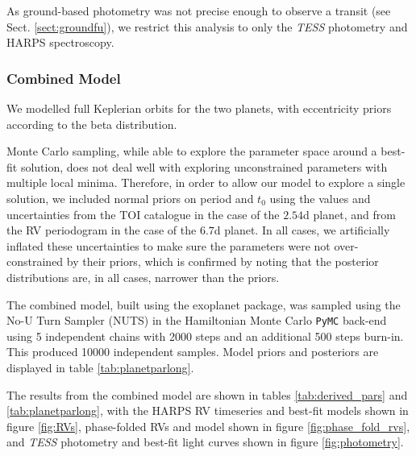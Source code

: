 \documentclass[fleqn,usenatbib]{mnras}
\newcommand{\tess}{{\it TESS}}
\newcommand{\harps}{{HARPS}}
\begin{document}
As ground-based photometry was not precise enough to observe a transit (see Sect. \ref{sect:groundfu}), we restrict this analysis to only the \tess{} photometry and \harps{} spectroscopy.

\subsubsection{Combined Model}
We modelled full Keplerian orbits for the two planets, with eccentricity priors according to the \citet{kipping2013parametrizing} beta distribution.

Monte Carlo sampling, while able to explore the parameter space around a best-fit solution, does not deal well with exploring unconstrained parameters with multiple local minima. 
Therefore, in order to allow our model to explore a single solution, we included normal priors on period and $t_0$ using the values and uncertainties from the TOI catalogue in the case of the $2.54$d planet, and from the RV periodogram in the case of the $6.7$d planet.
In all cases, we artificially inflated these uncertainties to make sure the parameters were not over-constrained by their priors, which is confirmed by noting that the posterior distributions are, in all cases, narrower than the priors.

The combined model, built using the \textsf{exoplanet} \citep{exoplanet:exoplanet} package, was sampled using the No-U Turn Sampler (NUTS) in the Hamiltonian Monte Carlo \texttt{PyMC} back-end \citep{exoplanet:pymc3} using 5 independent chains with 2000 steps and an additional 500 steps burn-in.
This produced 10000 independent samples.
Model priors and posteriors are displayed in table \ref{tab:planetparlong}.

The results from the combined model are shown in tables \ref{tab:derived_pars} and \ref{tab:planetparlong}, with the \harps{} RV timeseries and best-fit models shown in figure \ref{fig:RVs}, phase-folded RVs and model shown in figure \ref{fig:phase_fold_rvs}, and \tess{} photometry and best-fit light curves shown in figure \ref{fig:photometry}.
\end{document}
